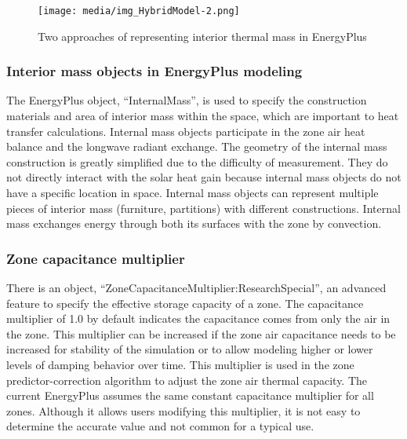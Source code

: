 \begin{figure}[h]
\begin{center}
\texttt{[image: media/img\_HybridModel-2.png]}
\caption{Two approaches of representing interior thermal mass in EnergyPlus}\protect \label{fig:two-approaches-of-representing-interior-thermal-mass-in-EnergyPlus}
\end{center}
\end{figure}

\subsubsection{Interior mass objects in EnergyPlus modeling}\label{interior-mass-objects-in-EnergyPlus-modeling}

The EnergyPlus object, ``InternalMass'', is used to specify the construction materials and area of interior mass within the space, which are important to heat transfer calculations. Internal mass objects participate in the zone air heat balance and the longwave radiant exchange. The geometry of the internal mass construction is greatly simplified due to the difficulty of measurement. They do not directly interact with the solar heat gain because internal mass objects do not have a specific location in space. Internal mass objects can represent multiple pieces of interior mass (furniture, partitions) with different constructions. Internal mass exchanges energy through both its surfaces with the zone by convection. 

\subsubsection{Zone capacitance multiplier}\label{zone-capacitance-multiplier}

There is an object, ``ZoneCapacitanceMultiplier:ResearchSpecial'', an advanced feature to specify the effective storage capacity of a zone. The capacitance multiplier of 1.0 by default indicates the capacitance comes from only the air in the zone. This multiplier can be increased if the zone air capacitance needs to be increased for stability of the simulation or to allow modeling higher or lower levels of damping behavior over time. This multiplier is used in the zone predictor-correction algorithm to adjust the zone air thermal capacity. The current EnergyPlus assumes the same constant capacitance multiplier for all zones. Although it allows users modifying this multiplier, it is not easy to determine the accurate value and not common for a typical use.

